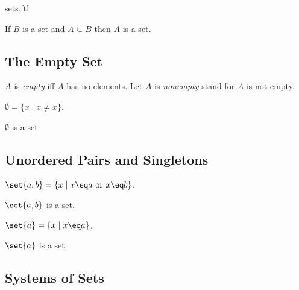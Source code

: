 \documentclass{article}
\begin{document}
\begin{smodule}{sets.ftl}
\begin{axiom*}[forthel,title=Separation Axiom,id=SeparationAx,printid]
  If $B$ is a set and $A\subseteq B$ then $A$ is a set.
\end{axiom*}


\subsection{The Empty Set}

\begin{definition*}[forthel,id=EmptyDef,printid]
  $A$ is \emph{empty} iff $A$ has no elements.
  Let $A$ is \emph{nonempty} stand for $A$ is not empty.
\end{definition*}

\begin{definition*}[forthel,id=EmptySetDef,printid]
  $\emptyset=\{x\mid x\neq x\}$.
\end{definition*}

\begin{axiom*}[forthel,title=Empty Set Axiom,id=EmptySetAx,printid]
  $\emptyset$ is a set.
\end{axiom*}


\subsection{Unordered Pairs and Singletons}

\begin{definition*}[forthel,id=UnorderedPairDef,printid]
  $\set{a,b}=\{x\mid x\eq a\text{ or }x\eq b\}$.
\end{definition*}

\begin{axiom*}[forthel,title=Pairing Axiom,id=UnorderedPairAx,printid]
  $\set{a,b}$ is a set.
\end{axiom*}

\begin{definition*}[forthel,id=SingletonDef,printid]
  $\set{a}=\{x\mid x\eq a\}$.
\end{definition*}

\begin{proposition*}[forthel,id=SingletonProp,printid]
  $\set{a}$ is a set.
\end{proposition*}


\subsection{Systems of Sets}


\end{smodule}
\end{document}
